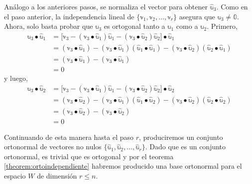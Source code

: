\begin{theorem}{}{}
\begin{description}[topsep=6pt, itemsep=0pt, leftmargin=0pt]
        Análogo a los anteriores pasos, se normaliza el vector para obtener $\hat{\mathbb{u}}_3$. Como en el paso anterior, la independencia lineal de $\{\mathbb{v}_1, \mathbb{v}_2, \dots, \mathbb{v}_r\}$ asegura que $\mathbb{u}_3 \neq \mathbb{0}$. Ahora, solo basta probar que $\mathbb{u}_3$ es ortogonal tanto a $\mathbb{u}_1$ como a $\mathbb{u}_2$. Primero,
        \begin{align*}
            \mathbb{u}_3 \bullet \hat{\mathbb{u}}_1 & = \big[ \mathbb{v}_3 - (\mathbb{v}_3 \bullet \hat{\mathbb{u}}_1) \hat{\mathbb{u}}_1 - (\mathbb{v}_3 \bullet \hat{\mathbb{u}}_2) \hat{\mathbb{u}}_2 \big] \bullet \hat{\mathbb{u}}_1 \\
            & = (\mathbb{v}_3 \bullet \hat{\mathbb{u}}_1) - (\mathbb{v}_3 \bullet \hat{\mathbb{u}}_1) (\hat{\mathbb{u}}_1 \bullet \hat{\mathbb{u}}_1) - (\mathbb{v}_3 \bullet \hat{\mathbb{u}}_2) (\hat{\mathbb{u}}_2 \bullet \hat{\mathbb{u}}_1) \\
            & = (\mathbb{v}_3 \bullet \hat{\mathbb{u}}_1) - (\mathbb{v}_3 \bullet \hat{\mathbb{u}}_1) \\
            & = 0
        \end{align*}
        y luego,
        \begin{align*}
            \mathbb{u}_3 \bullet \hat{\mathbb{u}}_2 & = \big[ \mathbb{v}_3 - (\mathbb{v}_3 \bullet \hat{\mathbb{u}}_1) \hat{\mathbb{u}}_1 - (\mathbb{v}_3 \bullet \hat{\mathbb{u}}_2) \hat{\mathbb{u}}_2 \big] \bullet \hat{\mathbb{u}}_2 \\
            & = (\mathbb{v}_3 \bullet \hat{\mathbb{u}}_2) - (\mathbb{v}_3 \bullet \hat{\mathbb{u}}_1) (\hat{\mathbb{u}}_1 \bullet \hat{\mathbb{u}}_2) - (\mathbb{v}_3 \bullet \hat{\mathbb{u}}_2) (\hat{\mathbb{u}}_2 \bullet \hat{\mathbb{u}}_2) \\
            & = (\mathbb{v}_3 \bullet \hat{\mathbb{u}}_2) - (\mathbb{v}_3 \bullet \hat{\mathbb{u}}_2) \\
            & = 0
        \end{align*}
    \end{description}
    Continuando de esta manera hasta el paso $r$, produciremos un conjunto ortonormal de vectores no nulos $\{ \hat{\mathbb{u}}_1, \hat{\mathbb{u}}_2, \dots, \hat{\mathbb{u}}_r\}$. Dado que es un conjunto ortonormal, es trivial que es ortogonal y por el teorema \ref{theorem:ortoindependiente} habremos producido una base ortonormal para el espacio $W$ de dimensión $r \leq n$.
\end{theorem}

